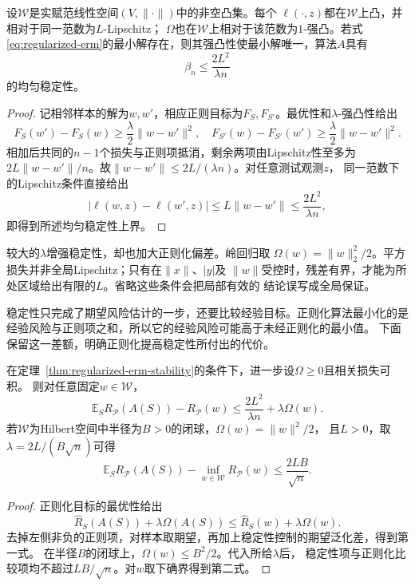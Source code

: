\begin{theorem}[强凸正则化的稳定性]
\label{thm:regularized-erm-stability}
设$\mathcal W$是实赋范线性空间$(V,\|\cdot\|)$中的非空凸集。每个
$\ell(\cdot,z)$都在$\mathcal W$上凸，并相对于同一范数为$L$-Lipschitz；
$\Omega$也在$\mathcal W$上相对于该范数为$1$-强凸。若式
\eqref{eq:regularized-erm}的最小解存在，则其强凸性使最小解唯一，算法$A$具有
\begin{equation}
 \beta_n\leq\frac{2L^2}{\lambda n}
 \label{eq:regularized-stability-bound}
\end{equation}
的均匀稳定性。
\end{theorem}

\begin{proof}
记相邻样本的解为$w,w'$，相应正则目标为$F_S,F_{S'}$。最优性和$\lambda$-强凸性给出
\begin{equation*}
 F_S(w')-F_S(w)\geq\frac\lambda2\|w-w'\|^2,
 \quad
 F_{S'}(w)-F_{S'}(w')\geq\frac\lambda2\|w-w'\|^2.
\end{equation*}
相加后共同的$n-1$个损失与正则项抵消，剩余两项由Lipschitz性至多为
$2L\|w-w'\|/n$。故$\|w-w'\|\leq2L/(\lambda n)$。对任意测试观测$z$，
同一范数下的Lipschitz条件直接给出
\[
 |\ell(w,z)-\ell(w',z)|
 \leq L\|w-w'\|
 \leq\frac{2L^2}{\lambda n},
\]
即得到所述均匀稳定性上界。
\end{proof}

较大的$\lambda$增强稳定性，却也加大正则化偏差。岭回归取
$\Omega(w)=\|w\|_2^2/2$。平方损失并非全局Lipschitz；只有在$\|x\|$、$|y|$及
$\|w\|$受控时，残差有界，才能为所处区域给出有限的$L$。省略这些条件会把局部有效的
结论误写成全局保证。

稳定性只完成了期望风险估计的一步，还要比较经验目标。正则化算法最小化的是
经验风险与正则项之和，所以它的经验风险可能高于未经正则化的最小值。
下面保留这一差额，明确正则化提高稳定性所付出的代价。

\begin{theorem}[正则化学习的期望风险保证]
\label{thm:regularized-learning-risk}
在定理~\ref{thm:regularized-erm-stability}的条件下，进一步设$\Omega\geq0$且相关损失可积。
则对任意固定$w\in\mathcal W$，
\begin{equation}
 \mathbb E_S R_{\mathcal P}(A(S))-R_{\mathcal P}(w)
 \leq\frac{2L^2}{\lambda n}+\lambda\Omega(w).
 \label{eq:regularization-excess-risk}
\end{equation}
若$\mathcal W$为Hilbert空间中半径为$B>0$的闭球，$\Omega(w)=\|w\|^2/2$，
且$L>0$，取$\lambda=2L/(B\sqrt n)$可得
\[
 \mathbb E_S R_{\mathcal P}(A(S))-\inf_{w\in\mathcal W}R_{\mathcal P}(w)
 \leq\frac{2LB}{\sqrt n}.
\]
\end{theorem}
\begin{proof}
正则化目标的最优性给出
\[
 \hat R_S(A(S))+\lambda\Omega(A(S))
 \leq\hat R_S(w)+\lambda\Omega(w).
\]
去掉左侧非负的正则项，对样本取期望，再加上稳定性控制的期望泛化差，得到第一式。
在半径$B$的闭球上，$\Omega(w)\leq B^2/2$。代入所给$\lambda$后，
稳定性项与正则化比较项均不超过$LB/\sqrt n$。对$w$取下确界得到第二式。
\end{proof}

